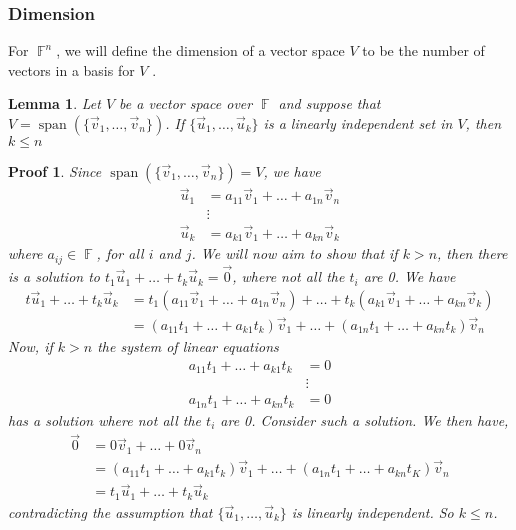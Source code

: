 \documentclass[10pt]{article}
\DeclareMathOperator{\F}{{\mathbb{F}}}
\DeclareMathOperator{\spn}{span}
\theoremstyle{break}
\newtheorem{lem}[thm]{Lemma}
\newtheorem*{pf}{Proof}
\begin{document}
\subsubsection*{Dimension}
For $\F^n$, we will define the dimension of a vector space $V$ to be the number of vectors in a basis for $V$ .
\begin{lem}
    Let $V$ be a vector space over $\F$ and suppose that $V = \spn(\{\vec{v}_1, \dots, \vec{v}_n\})$. If $\{\vec{u}_1, \dots, \vec{u}_k\}$ is a linearly independent set in $V$, then $k \le n$
\end{lem}
\begin{pf}
    Since $\spn(\{\vec{v}_1, \dots, \vec{v}_n\}) = V$, we have 
    \begin{align*}
        \vec{u}_1 &= a_{11}\vec{v}_1 + \dots + a_{1n}\vec{v}_n\\
        &\vdots\\
        \vec{u}_k &= a_{k1} \vec{v}_1 + \dots + a_{kn}\vec{v}_k
    \end{align*}
    where $a_{ij} \in \F$, for all $i$ and $j$. We will now aim to show that if $k > n$, then there is a solution to $t_1\vec{u}_1 + \dots + t_k\vec{u}_k = \vec{0}$, where not all the $t_i$ are 0. We have 
    \begin{align*}
        t\vec{u}_1 + \dots + t_k\vec{u}_k &= t_1(a_{11}\vec{v}_1 + \dots + a_{1n}\vec{v}_n) + \dots + t_k(a_{k1} \vec{v}_1 + \dots + a_{kn}\vec{v}_k)\\
        &= (a_{11}t_1 + \dots + a_{k1}t_k)\vec{v}_1 + \dots + (a_{1n}t_1 + \dots + a_{kn}t_k)\vec{v}_n
    \end{align*}
    Now, if $k > n$ the system of linear equations 
    \begin{align*}
        a_{11}t_1 + \dots + a_{k1}t_k &= 0\\
        &\vdots \\
        a_{1n}t_1 + \dots + a_{kn}t_k &= 0
    \end{align*}
    has a solution where not all the $t_i$ are 0. Consider such a solution. We then have, 
    \begin{align*}
        \vec{0} &= 0\vec{v}_1 + \dots + 0\vec{v}_n\\
        &= (a_{11}t_1 + \dots + a_{k1}t_k)\vec{v}_1 + \dots + (a_{1n}t_1 + \dots + a_{kn}t_K)\vec{v}_n\\
        &= t_1\vec{u}_1 + \dots + t_{k}\vec{u}_k
    \end{align*}
    contradicting the assumption that $\{\vec{u}_1, \dots, \vec{u}_k\}$ is linearly independent. So $k \le n$.
\end{pf}
\end{document}
